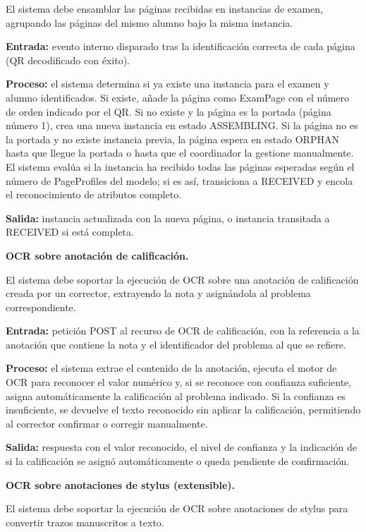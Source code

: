 \begin{functional}
\begin{functional}
    El sistema debe ensamblar las páginas recibidas en instancias de examen, agrupando las páginas del mismo alumno bajo la misma instancia.

    \textbf{Entrada:} evento interno disparado tras la identificación correcta de cada página (QR decodificado con éxito).

    \textbf{Proceso:} el sistema determina si ya existe una instancia para el examen y alumno identificados. Si existe, añade la página como ExamPage con el número de orden indicado por el QR. Si no existe y la página es la portada (página número 1), crea una nueva instancia en estado ASSEMBLING. Si la página no es la portada y no existe instancia previa, la página espera en estado ORPHAN hasta que llegue la portada o hasta que el coordinador la gestione manualmente. El sistema evalúa si la instancia ha recibido todas las páginas esperadas según el número de PageProfiles del modelo; si es así, transiciona a RECEIVED y encola el reconocimiento de atributos completo.

    \textbf{Salida:} instancia actualizada con la nueva página, o instancia transitada a RECEIVED si está completa.

    \item \textbf{OCR sobre anotación de calificación.}

    El sistema debe soportar la ejecución de OCR sobre una anotación de calificación creada por un corrector, extrayendo la nota y asignándola al problema correspondiente.

    \textbf{Entrada:} petición POST al recurso de OCR de calificación, con la referencia a la anotación que contiene la nota y el identificador del problema al que se refiere.

    \textbf{Proceso:} el sistema extrae el contenido de la anotación, ejecuta el motor de OCR para reconocer el valor numérico y, si se reconoce con confianza suficiente, asigna automáticamente la calificación al problema indicado. Si la confianza es insuficiente, se devuelve el texto reconocido sin aplicar la calificación, permitiendo al corrector confirmar o corregir manualmente.

    \textbf{Salida:} respuesta con el valor reconocido, el nivel de confianza y la indicación de si la calificación se asignó automáticamente o queda pendiente de confirmación.

    \item \textbf{OCR sobre anotaciones de stylus (extensible).}

    El sistema debe soportar la ejecución de OCR sobre anotaciones de stylus para convertir trazos manuscritos a texto.


\end{functional}
\end{functional}
